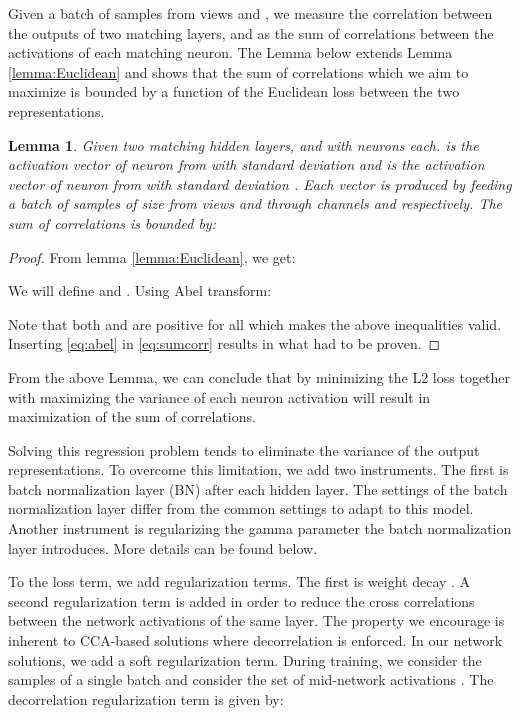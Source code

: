 \documentclass[10pt,twocolumn,letterpaper]{article}
\newtheorem{lemma}{Lemma}
\begin{document}
Given a batch of samples from views  and , we measure the correlation between the outputs of two matching layers,  and  as the sum of correlations between the activations of each matching neuron. The Lemma below extends Lemma \ref{lemma:Euclidean} and shows that the sum of correlations which we aim to maximize is bounded by a function of the Euclidean loss between the two representations.

\begin{lemma}\label{lemma:sumcorr}
Given two matching hidden layers,  and  with  neurons each.  is the activation vector of neuron  from  with standard deviation  and  is the activation vector of neuron  from  with standard deviation . Each vector is produced by feeding a batch of samples of size  from views  and  through channels  and  respectively. The sum of correlations  is bounded by:

\end{lemma}
\begin{proof}
From lemma \ref{lemma:Euclidean}, we get:

We will define  and .
Using Abel transform:

Note that both  and  are positive for all  which makes the above inequalities valid.
Inserting \ref{eq:abel} in \ref{eq:sumcorr} results in what had to be proven.
\end{proof}
From the above Lemma, we can conclude that by minimizing the L2 loss together with maximizing the variance of each neuron activation will result in maximization of the sum of correlations. 

Solving this regression problem tends to eliminate the variance of the output representations. To overcome this limitation, we add two instruments. The first is batch normalization layer \cite{bn} (BN) after each hidden layer. The settings of the batch normalization layer differ from the common settings to adapt to this model. Another instrument is regularizing the gamma parameter the batch normalization layer introduces. More details can be found below.

To the loss term, we add regularization terms. The first is weight decay . A second regularization term is added in order to reduce the cross correlations between the network activations of the same layer. The property we encourage is inherent to CCA-based solutions where decorrelation is enforced. In our network solutions, we add a soft regularization term. During training, we consider the  samples of a single batch  and consider the set of mid-network activations . The decorrelation regularization term is given by: 
\end{document}
